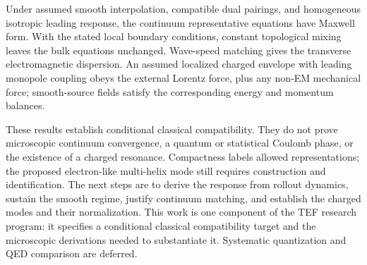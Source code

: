 \documentclass[11pt]{article}
\begin{document}
Under assumed smooth interpolation, compatible dual pairings, and homogeneous isotropic leading response, the continuum representative equations have Maxwell form. With the stated local boundary conditions, constant topological mixing leaves the bulk equations unchanged. Wave-speed matching gives the transverse electromagnetic dispersion. An assumed localized charged envelope with leading monopole coupling obeys the external Lorentz force, plus any non-EM mechanical force; smooth-source fields satisfy the corresponding energy and momentum balances.

These results establish conditional classical compatibility. They do not prove microscopic continuum convergence, a quantum or statistical Coulomb phase, or the existence of a charged resonance. Compactness labels allowed representations; the proposed electron-like multi-helix mode still requires construction and identification. The next steps are to derive the response from rollout dynamics, sustain the smooth regime, justify continuum matching, and establish the charged modes and their normalization. This work is one component of the TEF research program: it specifies a conditional classical compatibility target and the microscopic derivations needed to substantiate it. Systematic quantization and QED comparison are deferred.
\end{document}
